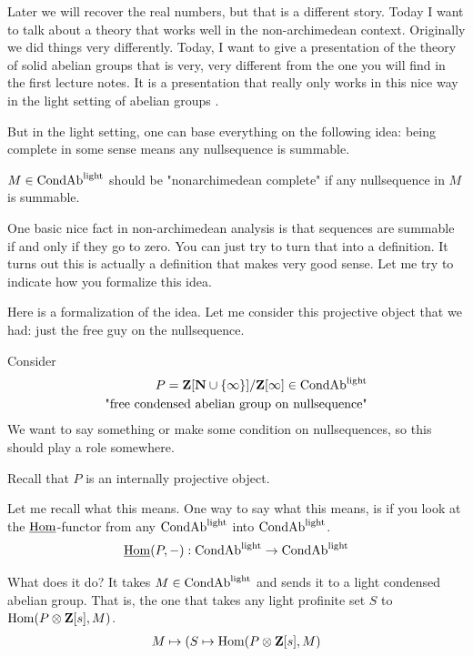 % 
Later we will recover the real numbers, but that is a different story. 
Today I want to talk about a theory that works well in the non-archimedean context. 
Originally we did things very differently. Today, I want to give a presentation of the theory of solid abelian groups that is very, very different from the one you will find in the first lecture notes. 
It is a presentation that really only works in this nice way in the light setting of abelian groups .

But in the light setting, one can base everything on the following idea: being complete in some sense means any nullsequence is summable. 

\begin{idea}
$M \in \mathrm{Cond}\mathrm{Ab}^{\mathrm{light}}$ should be "nonarchimedean complete" if any nullsequence in $M$ is summable.
\end{idea}

One basic nice fact in non-archimedean analysis is that sequences are summable if and only if they go to zero. 
You can just try to turn that into a definition. It turns out this is actually a definition that makes very good sense. 
Let me try to indicate how you formalize this idea.

Here is a formalization of the idea. Let me consider this projective object that we had: just the free guy on the nullsequence. 

\begin{formalization}
Consider 
\begin{align*}
P = \mathbf Z [\mathbf N \cup \{\infty\}] / \mathbf Z[\infty] \in \mathrm{Cond}\mathrm{Ab}^{\mathrm{light}} \\
\text{"free condensed abelian group on nullsequence"}
\end{align*}
We want to say something or make some condition on nullsequences, so this should play a role somewhere. 
\end{formalization}

Recall that $P$ is an internally projective object. 

Let me recall what this means.
One way to say what this means, is if you look at the $\operatorname{\underline{Hom}}$-functor from any $\mathrm{Cond}\mathrm{Ab}^{\mathrm{light}}$ into $\mathrm{Cond}\mathrm{Ab}^{\mathrm{light}}$. 
\begin{align*}
\operatorname{\underline{Hom}}(P,-): \mathrm{Cond}\mathrm{Ab}^{\mathrm{light}} \to \mathrm{Cond}\mathrm{Ab}^{\mathrm{light}}
\end{align*}

What does it do? It takes $M \in \mathrm{Cond}\mathrm{Ab}^{\mathrm{light}}$ and sends it to a light condensed abelian group. That is, the one that takes any light profinite set $S$ to $\operatorname{Hom}(P \otimes \mathbf Z[s], M)$.
\begin{align*}
M \mapsto (S \mapsto \operatorname{Hom}(P \otimes \mathbf Z[s], M)
\end{align*}

